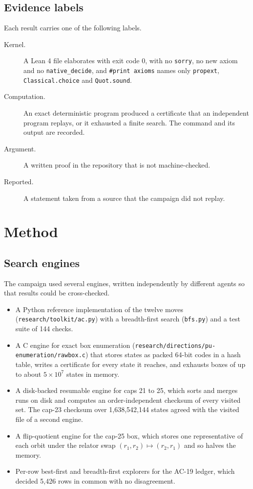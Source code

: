 \documentclass[11pt,a4paper]{article}
\theoremstyle{definition}
\begin{document}
\subsection{Evidence labels}

Each result carries one of the following labels.

\begin{description}
\item[Kernel.] A Lean 4 file elaborates with exit code 0, with no \texttt{sorry}, no new axiom and no \texttt{native\_decide}, and \texttt{\#print axioms} names only \texttt{propext}, \texttt{Classical.choice} and \texttt{Quot.sound}.
\item[Computation.] An exact deterministic program produced a certificate that an independent program replays, or it exhausted a finite search. The command and its output are recorded.
\item[Argument.] A written proof in the repository that is not machine-checked.
\item[Reported.] A statement taken from a source that the campaign did not replay.
\end{description}

\section{Method}\label{sec:method}

\subsection{Search engines}

The campaign used several engines, written independently by different agents so that results could be cross-checked.

\begin{itemize}
\item A Python reference implementation of the twelve moves (\texttt{research/toolkit/ac.py}) with a breadth-first search (\texttt{bfs.py}) and a test suite of 144 checks.
\item A C engine for exact box enumeration (\texttt{research/directions/pu-enumeration/rawbox.c}) that stores states as packed 64-bit codes in a hash table, writes a certificate for every state it reaches, and exhausts boxes of up to about $5\times10^7$ states in memory.
\item A disk-backed resumable engine for caps 21 to 25, which sorts and merges runs on disk and computes an order-independent checksum of every visited set. The cap-23 checksum over 1,638,542,144 states agreed with the visited file of a second engine.
\item A flip-quotient engine for the cap-25 box, which stores one representative of each orbit under the relator swap $(r_1,r_2)\mapsto(r_2,r_1)$ and so halves the memory.
\item Per-row best-first and breadth-first explorers for the AC-19 ledger, which decided 5,426 rows in common with no disagreement.
\end{itemize}
\end{document}
